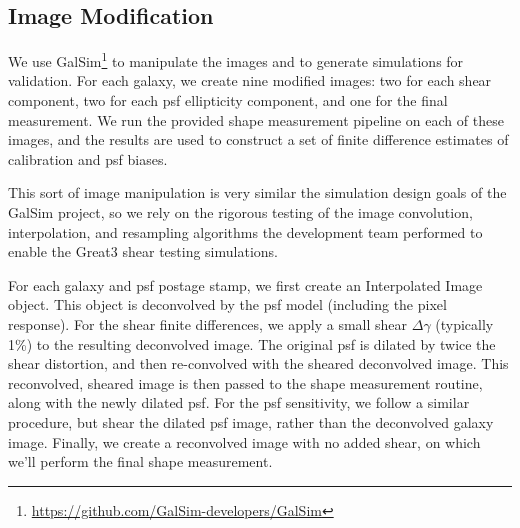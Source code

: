 \documentclass[iop]{emulateapj}
\begin{document}
\subsection{Image Modification}
We use GalSim\footnote{\url{https://github.com/GalSim-developers/GalSim}}
\citep{2015A&C....10..121R} to manipulate the images and to generate simulations for validation. For each galaxy, we create nine modified images: two for each shear component, two for each psf ellipticity component, and one for the final measurement. We run the provided shape measurement pipeline on each of these images, and the results are used to construct a set of finite difference estimates of calibration and psf biases.

This sort of image manipulation is very similar the simulation design goals of the GalSim  project, so we rely on the rigorous testing of the image convolution, interpolation, and resampling algorithms the development team performed to enable the Great3 shear testing simulations.

For each galaxy and psf postage stamp, we first create an Interpolated Image object. This object is deconvolved by the psf model (including the pixel response). For the shear finite differences, we apply a small shear $\Delta\gamma$ (typically 1\%) to the resulting deconvolved image. The original psf is dilated by twice the shear distortion, and then re-convolved with the sheared deconvolved image. This reconvolved, sheared image is then passed to the shape measurement routine, along with the newly dilated psf. For the psf sensitivity, we follow a similar procedure, but shear the dilated psf image, rather than the deconvolved galaxy image. Finally, we create a reconvolved image with no added shear, on which we'll perform the final shape measurement. 
\end{document}
